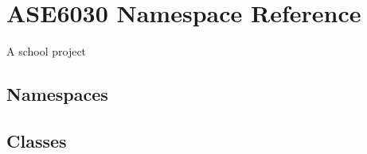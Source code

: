 \hypertarget{namespace_a_s_e6030}{}\section{A\+S\+E6030 Namespace Reference}
\label{namespace_a_s_e6030}


A school project  


\subsection*{Namespaces}
\begin{DoxyCompactItemize}
\end{DoxyCompactItemize}
\subsection*{Classes}
